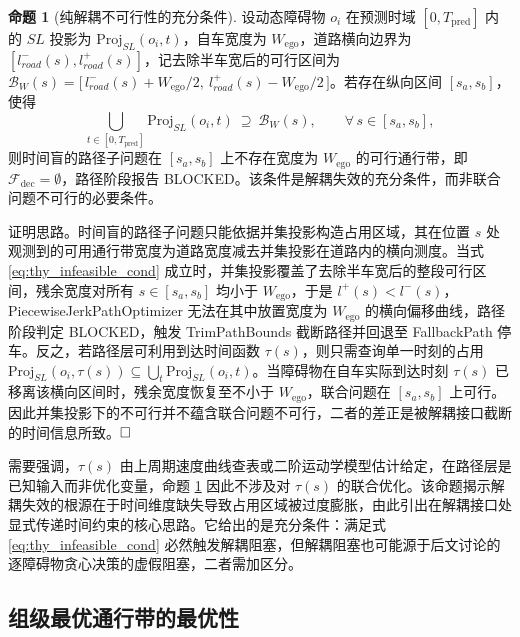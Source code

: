 \documentclass[a4paper,11pt]{ctexart}
\theoremstyle{definition}
\newtheorem{proposition}{命题}[section]
\begin{document}
\begin{proposition}[纯解耦不可行性的充分条件]
\label{prop:decoupled_infeasible}
设动态障碍物 $o_i$ 在预测时域 $[0, T_{\text{pred}}]$ 内的 $SL$ 投影为 $\mathrm{Proj}_{SL}(o_i, t)$，自车宽度为 $W_{\text{ego}}$，道路横向边界为 $[l_{road}^{-}(s), l_{road}^{+}(s)]$，记去除半车宽后的可行区间为 $\mathcal{B}_{W}(s) = \bigl[\, l_{road}^{-}(s) + W_{\text{ego}}/2,\ l_{road}^{+}(s) - W_{\text{ego}}/2 \,\bigr]$。若存在纵向区间 $[s_a, s_b]$，使得
\begin{equation}
    \bigcup_{t \in [0, T_{\text{pred}}]} \mathrm{Proj}_{SL}(o_i, t)\ \supseteq\ \mathcal{B}_{W}(s), \qquad \forall\, s \in [s_a, s_b],
    \label{eq:thy_infeasible_cond}
\end{equation}
则时间盲的路径子问题在 $[s_a, s_b]$ 上不存在宽度为 $W_{\text{ego}}$ 的可行通行带，即 $\mathcal{F}_{\text{dec}} = \emptyset$，路径阶段报告 BLOCKED。该条件是解耦失效的充分条件，而非联合问题不可行的必要条件。
\end{proposition}

证明思路。时间盲的路径子问题只能依据并集投影构造占用区域，其在位置 $s$ 处观测到的可用通行带宽度为道路宽度减去并集投影在道路内的横向测度。当式 \eqref{eq:thy_infeasible_cond} 成立时，并集投影覆盖了去除半车宽后的整段可行区间，残余宽度对所有 $s \in [s_a, s_b]$ 均小于 $W_{\text{ego}}$，于是 $l^{+}(s) < l^{-}(s)$，PiecewiseJerkPathOptimizer 无法在其中放置宽度为 $W_{\text{ego}}$ 的横向偏移曲线，路径阶段判定 BLOCKED，触发 TrimPathBounds 截断路径并回退至 FallbackPath 停车。反之，若路径层可利用到达时间函数 $\tau(s)$，则只需查询单一时刻的占用 $\mathrm{Proj}_{SL}(o_i, \tau(s)) \subseteq \bigcup_t \mathrm{Proj}_{SL}(o_i, t)$。当障碍物在自车实际到达时刻 $\tau(s)$ 已移离该横向区间时，残余宽度恢复至不小于 $W_{\text{ego}}$，联合问题在 $[s_a, s_b]$ 上可行。因此并集投影下的不可行并不蕴含联合问题不可行，二者的差正是被解耦接口截断的时间信息所致。$\hfill\Box$

需要强调，$\tau(s)$ 由上周期速度曲线查表或二阶运动学模型估计给定，在路径层是已知输入而非优化变量，命题 \ref{prop:decoupled_infeasible} 因此不涉及对 $\tau(s)$ 的联合优化。该命题揭示解耦失效的根源在于时间维度缺失导致占用区域被过度膨胀，由此引出在解耦接口处显式传递时间约束的核心思路。它给出的是充分条件：满足式 \eqref{eq:thy_infeasible_cond} 必然触发解耦阻塞，但解耦阻塞也可能源于后文讨论的逐障碍物贪心决策的虚假阻塞，二者需加区分。

\subsection{组级最优通行带的最优性}
\label{sec:thy_max_gap}
\end{document}
